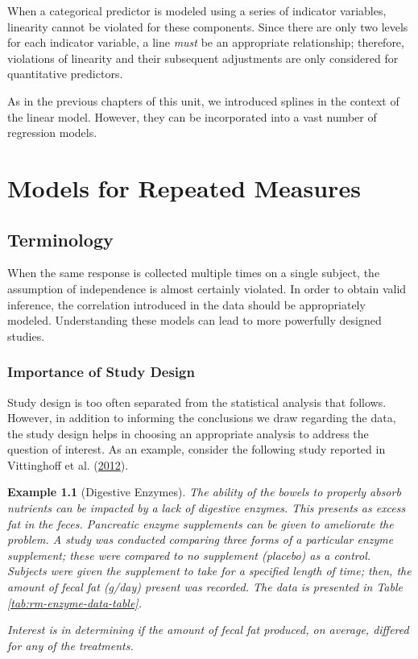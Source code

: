 \documentclass[
]{book}
\theoremstyle{plain}
\theoremstyle{mydefn}
\theoremstyle{myexmpl}
\newtheorem{example}{Example}[chapter]
\theoremstyle{remark}
\begin{document}
\begin{rmdtip}
When a categorical predictor is modeled using a series of indicator variables, linearity cannot be violated for these components. Since there are only two levels for each indicator variable, a line \emph{must} be an appropriate relationship; therefore, violations of linearity and their subsequent adjustments are only considered for quantitative predictors.
\end{rmdtip}

As in the previous chapters of this unit, we introduced splines in the context of the linear model. However, they can be incorporated into a vast number of regression models.

\hypertarget{part-models-for-repeated-measures}{%
\part{Models for Repeated Measures}\label{part-models-for-repeated-measures}}

\hypertarget{rm-terminology}{%
\chapter{Terminology}\label{rm-terminology}}

When the same response is collected multiple times on a single subject, the assumption of independence is almost certainly violated. In order to obtain valid inference, the correlation introduced in the data should be appropriately modeled. Understanding these models can lead to more powerfully designed studies.

\hypertarget{importance-of-study-design}{%
\section{Importance of Study Design}\label{importance-of-study-design}}

Study design is too often separated from the statistical analysis that follows. However, in addition to informing the conclusions we draw regarding the data, the study design helps in choosing an appropriate analysis to address the question of interest. As an example, consider the following study reported in Vittinghoff et al. (\protect\hyperlink{ref-Vittinghoff2012}{2012}).

\begin{example}[Digestive Enzymes]
\protect\hypertarget{exm:rm-enzyme}{}{\label{exm:rm-enzyme} {} }The ability of the bowels to properly absorb nutrients can be impacted by a lack of digestive enzymes. This presents as excess fat in the feces. Pancreatic enzyme supplements can be given to ameliorate the problem. A study was conducted comparing three forms of a particular enzyme supplement; these were compared to no supplement (placebo) as a control. Subjects were given the supplement to take for a specified length of time; then, the amount of fecal fat (g/day) present was recorded. The data is presented in Table \ref{tab:rm-enzyme-data-table}.

Interest is in determining if the amount of fecal fat produced, on average, differed for any of the treatments.
\end{example}
\end{document}
